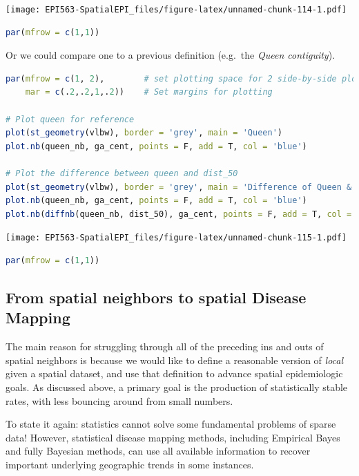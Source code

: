 \documentclass[
]{book}
\begin{document}
\texttt{[image: EPI563-SpatialEPI\_files/figure-latex/unnamed-chunk-114-1.pdf]}

\begin{lstlisting}[language=R]
par(mfrow = c(1,1))
\end{lstlisting}

Or we could compare one to a previous definition (e.g.~the \emph{Queen contiguity}).

\begin{lstlisting}[language=R]
par(mfrow = c(1, 2),        # set plotting space for 2 side-by-side plots
    mar = c(.2,.2,1,.2))    # Set margins for plotting

# Plot queen for reference
plot(st_geometry(vlbw), border = 'grey', main = 'Queen')
plot.nb(queen_nb, ga_cent, points = F, add = T, col = 'blue')

# Plot the difference between queen and dist_50
plot(st_geometry(vlbw), border = 'grey', main = 'Difference of Queen & 50-km dist')
plot.nb(queen_nb, ga_cent, points = F, add = T, col = 'blue')
plot.nb(diffnb(queen_nb, dist_50), ga_cent, points = F, add = T, col = 'red')
\end{lstlisting}

\texttt{[image: EPI563-SpatialEPI\_files/figure-latex/unnamed-chunk-115-1.pdf]}

\begin{lstlisting}[language=R]
par(mfrow = c(1,1))
\end{lstlisting}

\hypertarget{from-spatial-neighbors-to-spatial-disease-mapping}{%
\subsection{From spatial neighbors to spatial Disease Mapping}\label{from-spatial-neighbors-to-spatial-disease-mapping}}

The main reason for struggling through all of the preceding ins and outs of spatial neighbors is because we would like to define a reasonable version of \emph{local} given a spatial dataset, and use that definition to advance spatial epidemiologic goals. As discussed above, a primary goal is the production of statistically stable rates, with less bouncing around from small numbers.

To state it again: statistics cannot solve some fundamental problems of sparse data! However, statistical disease mapping methods, including Empirical Bayes and fully Bayesian methods, can use all available information to recover important underlying geographic trends in some instances.
\end{document}
